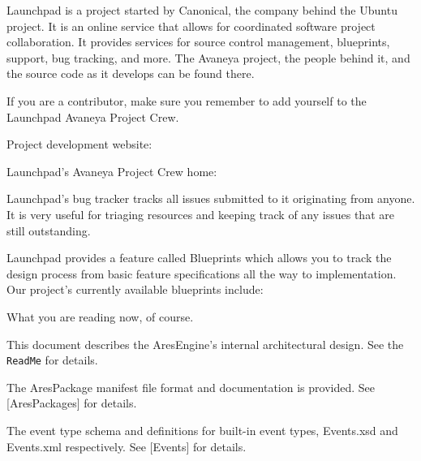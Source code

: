 

Launchpad is a project started by Canonical, the company behind the Ubuntu project. It is an online service that allows for coordinated software project collaboration. It provides services for source control management, blueprints, support, bug tracking, and more. The Avaneya project, the people behind it, and the source code as it develops can be found there.

If you are a contributor, make sure you remember to add yourself to the Launchpad Avaneya Project Crew.

\blank[2*big]
\startnarrower[3*left]
Project development website:\crlf
{}

\blank[2*big]
Launchpad's Avaneya Project Crew home:\crlf
{}
\stopnarrower

Launchpad's bug tracker tracks all issues submitted to it originating from anyone. It is very useful for triaging resources and keeping track of any issues that are still outstanding.

\startnarrower[3*left]
\stopnarrower

Launchpad provides a feature called Blueprints which allows you to track the design process from basic feature specifications all the way to implementation. Our project's currently available blueprints include:

\startitemize[4]
\setupwhitespace[big]

What you are reading now, of course.


This document describes the AresEngine's internal architectural design. See the {\tt ReadMe} for details.

\startnarrower[3*left]
\stopnarrower


The AresPackage manifest file format and documentation is provided. See [AresPackages] for details.

\startnarrower[3*left]
\stopnarrower


The event type schema and definitions for built-in event types, Events.xsd and Events.xml respectively. See [Events] for details.
\stopitemize

